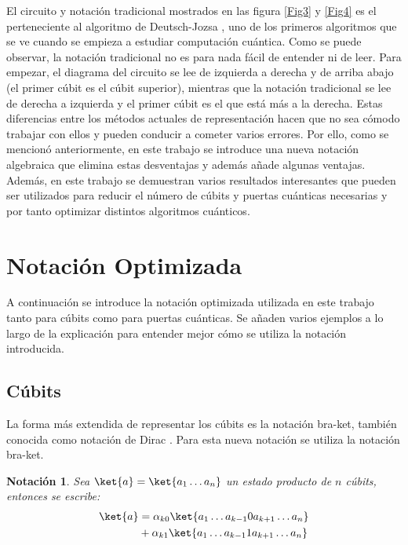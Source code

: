 \documentclass[10pt,conference,a4paper]{IEEEtran}
\newtheorem{notacion}{Notación}[subsection]
\begin{document}
El circuito y notación tradicional mostrados en las figura \ref{Fig3} y \ref{Fig4} es el perteneciente al algoritmo de Deutsch-Jozsa \cite{Deutsch-Jozsa}, uno de los primeros algoritmos que se ve cuando se empieza a estudiar  computación cuántica. Como se puede observar, la notación tradicional no es para nada fácil de entender ni de leer. Para empezar, el diagrama del circuito se lee de izquierda a derecha y de arriba abajo (el primer cúbit es el cúbit superior), mientras que la notación tradicional se lee de derecha a izquierda y el primer cúbit es el que está más a la derecha. Estas diferencias entre los métodos actuales de representación hacen que no sea cómodo trabajar con ellos y pueden conducir a cometer varios errores. Por ello, como se mencionó anteriormente, en este trabajo se introduce una nueva notación algebraica que elimina estas desventajas y además añade algunas ventajas. Además, en este trabajo se demuestran varios resultados interesantes que pueden ser utilizados para reducir el número de cúbits y puertas cuánticas necesarias y por tanto optimizar distintos algoritmos cuánticos.


\section{Notación Optimizada}
\label{seccion:3}
A continuación se introduce la  notación optimizada  utilizada en este trabajo tanto para cúbits como para puertas cuánticas. Se añaden varios ejemplos a lo largo de la explicación para entender mejor cómo se utiliza  la notación introducida.

\subsection{Cúbits}
La forma más extendida de representar los cúbits es la notación bra-ket, también conocida como notación de Dirac \cite{Nielsen_Chuang}. Para esta nueva notación se utiliza la notación bra-ket.
\begin{notacion}
    Sea $\ket{a}=\ket{a_1\ldots a_n}$ un estado producto de $n$ cúbits, entonces se escribe:
    \begin{align}
    \begin{split}
                \ket{a}&=\alpha_{k0}\ket{a_1\ldots a_{k-1}0a_{k+1}\ldots a_n}\\
                &+\alpha_{k1}\ket{a_1\ldots a_{k-1}1a_{k+1}\ldots a_n}
    \end{split}
    \end{align}
    \label{not:1}
\end{notacion}
\end{document}
